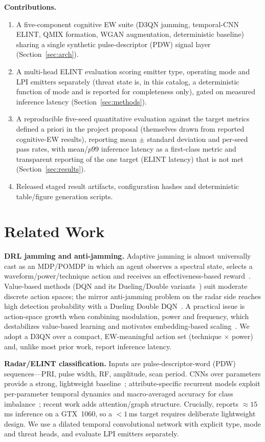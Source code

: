 \documentclass[journal]{IEEEtran}
\begin{document}
\textbf{Contributions.}
\begin{enumerate}
\item A five-component cognitive EW suite (D3QN jamming, temporal-CNN ELINT,
QMIX formation, WGAN augmentation, deterministic baseline) sharing a single synthetic
pulse-descriptor (PDW) signal layer (Section~\ref{sec:arch}).
\item A multi-head ELINT evaluation scoring emitter type, operating mode and LPI emitters
separately (threat state is, in this catalog, a deterministic function of mode and is reported
for completeness only), gated on measured inference latency (Section~\ref{sec:methods}).
\item A reproducible five-seed quantitative evaluation against the target metrics defined a
priori in the project proposal (themselves drawn from reported cognitive-EW results), reporting
mean $\pm$ standard deviation and per-seed pass rates, with mean/$p99$ inference latency as a
first-class metric and transparent reporting of the one target (ELINT latency) that is not met
(Section~\ref{sec:results}).
\item Released staged result artifacts, configuration hashes and deterministic table/figure
generation scripts.
\end{enumerate}

\section{Related Work}
\textbf{DRL jamming and anti-jamming.} Adaptive jamming is almost universally cast as an
MDP/POMDP in which an agent observes a spectral state, selects a waveform/power/technique action
and receives an effectiveness-based reward~\cite{zhao2022sac}. Value-based methods (DQN and its
Dueling/Double variants~\cite{wang2016dueling,vanhasselt2016double}) suit moderate discrete
action spaces; the mirror anti-jamming problem on the radar side reaches high detection
probability with a Dueling Double DQN~\cite{wang2022d3qn}. A practical issue is action-space
growth when combining modulation, power and frequency, which destabilizes value-based learning
and motivates embedding-based scaling~\cite{zhao2022sac}. We adopt a D3QN over a compact,
EW-meaningful action set (technique $\times$ power) and, unlike most prior work, report
inference latency.

\textbf{Radar/ELINT classification.} Inputs are pulse-descriptor-word (PDW) sequences---PRI,
pulse width, RF, amplitude, scan period. CNNs over parameters provide a strong, lightweight
baseline~\cite{matuszewski2021cnn}; attribute-specific recurrent models exploit per-parameter
temporal dynamics and macro-averaged accuracy for class imbalance~\cite{liu2019attrnn}; recent
work adds attention/graph structure. Crucially, \cite{matuszewski2021cnn} reports
$\approx 15$\,ms inference on a GTX~1060, so a $<1$\,ms target requires deliberate
lightweight design. We use a dilated temporal convolutional network with explicit type, mode
and threat heads, and evaluate LPI emitters separately.
\end{document}
